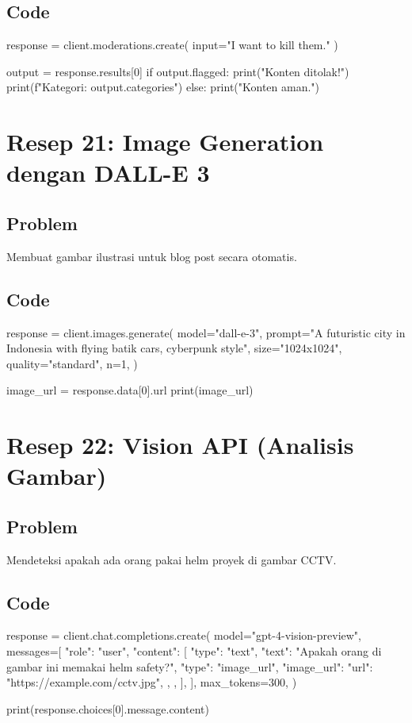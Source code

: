 \subsection*{Code}
\begin{codeblock}[language=Python]
response = client.moderations.create(
    input="I want to kill them."
)

output = response.results[0]
if output.flagged:
    print("Konten ditolak!")
    print(f"Kategori: {output.categories}")
else:
    print("Konten aman.")
\end{codeblock}

\newpage

\section{Resep 21: Image Generation dengan DALL-E 3}

\subsection*{Problem}
Membuat gambar ilustrasi untuk blog post secara otomatis.

\subsection*{Code}
\begin{codeblock}[language=Python]
response = client.images.generate(
  model="dall-e-3",
  prompt="A futuristic city in Indonesia with flying batik cars, cyberpunk style",
  size="1024x1024",
  quality="standard",
  n=1,
)

image_url = response.data[0].url
print(image_url)
\end{codeblock}

\newpage

\section{Resep 22: Vision API (Analisis Gambar)}

\subsection*{Problem}
Mendeteksi apakah ada orang pakai helm proyek di gambar CCTV.

\subsection*{Code}
\begin{codeblock}[language=Python]
response = client.chat.completions.create(
  model="gpt-4-vision-preview",
  messages=[
    {
      "role": "user",
      "content": [
        {"type": "text", "text": "Apakah orang di gambar ini memakai helm safety?"},
        {
          "type": "image_url",
          "image_url": {
            "url": "https://example.com/cctv.jpg",
          },
        },
      ],
    }
  ],
  max_tokens=300,
)

print(response.choices[0].message.content)
\end{codeblock}

